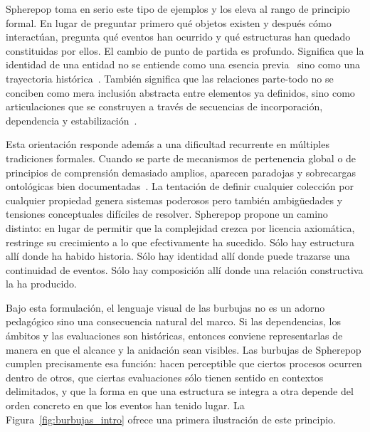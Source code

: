 \documentclass[12pt]{article}
\theoremstyle{plain}
\theoremstyle{definition}
\begin{document}
Spherepop toma en serio este tipo de ejemplos y los eleva al rango de principio formal. En lugar de preguntar primero qué objetos existen y después cómo interactúan, pregunta qué eventos han ocurrido y qué estructuras han quedado constituidas por ellos. El cambio de punto de partida es profundo. Significa que la identidad de una entidad no se entiende como una esencia previa~\cite{aristoteles} sino como una trayectoria histórica~\cite{kim}. También significa que las relaciones parte-todo no se conciben como mera inclusión abstracta entre elementos ya definidos, sino como articulaciones que se construyen a través de secuencias de incorporación, dependencia y estabilización~\cite{simons,varzi}.

Esta orientación responde además a una dificultad recurrente en múltiples tradiciones formales. Cuando se parte de mecanismos de pertenencia global o de principios de comprensión demasiado amplios, aparecen paradojas y sobrecargas ontológicas bien documentadas~\cite{russellparadox,zermelo}. La tentación de definir cualquier colección por cualquier propiedad genera sistemas poderosos pero también ambigüedades y tensiones conceptuales difíciles de resolver. Spherepop propone un camino distinto: en lugar de permitir que la complejidad crezca por licencia axiomática, restringe su crecimiento a lo que efectivamente ha sucedido. Sólo hay estructura allí donde ha habido historia. Sólo hay identidad allí donde puede trazarse una continuidad de eventos. Sólo hay composición allí donde una relación constructiva la ha producido.

Bajo esta formulación, el lenguaje visual de las burbujas no es un adorno pedagógico sino una consecuencia natural del marco. Si las dependencias, los ámbitos y las evaluaciones son históricas, entonces conviene representarlas de manera en que el alcance y la anidación sean visibles. Las burbujas de Spherepop cumplen precisamente esa función: hacen perceptible que ciertos procesos ocurren dentro de otros, que ciertas evaluaciones sólo tienen sentido en contextos delimitados, y que la forma en que una estructura se integra a otra depende del orden concreto en que los eventos han tenido lugar. La Figura~\ref{fig:burbujas_intro} ofrece una primera ilustración de este principio.
\end{document}

